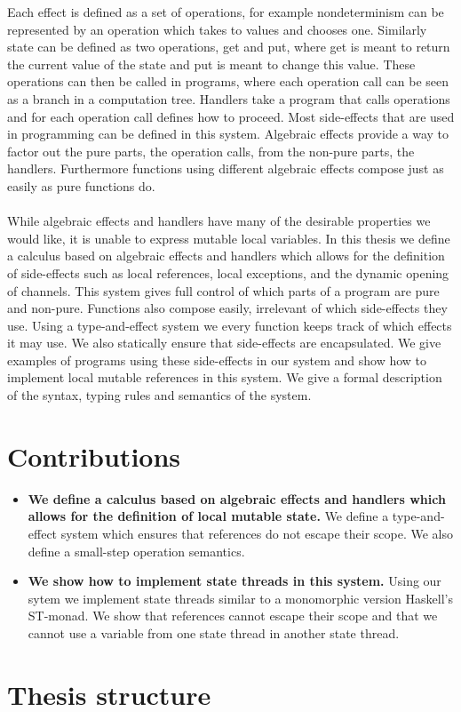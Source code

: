 Each effect is defined as a set of operations, for example nondeterminism can be represented by an operation which takes to values and chooses one.
Similarly state can be defined as two operations, get and put, where get is meant to return the current value of the state and put is meant to change this value.
These operations can then be called in programs, where each operation call can be seen as a branch in a computation tree.
Handlers take a program that calls operations and for each operation call defines how to proceed.
Most side-effects that are used in programming can be defined in this system.
Algebraic effects provide a way to factor out the pure parts, the operation calls, from the non-pure parts, the handlers.
Furthermore functions using different algebraic effects compose just as easily as pure functions do.
\\\\
While algebraic effects and handlers have many of the desirable properties we would like, it is unable to express mutable local variables.
In this thesis we define a calculus based on algebraic effects and handlers which allows for the definition of side-effects such as local references, local exceptions, and the dynamic opening of channels.
This system gives full control of which parts of a program are pure and non-pure.
Functions also compose easily, irrelevant of which side-effects they use.
Using a type-and-effect system we every function keeps track of which effects it may use.
We also statically ensure that side-effects are encapsulated.
We give examples of programs using these side-effects in our system and show how to implement local mutable references in this system.
We give a formal description of the syntax, typing rules and semantics of the system.

\section{Contributions}
\begin{itemize}

\item \textbf{We define a calculus based on algebraic effects and handlers which allows for the definition of local mutable state.}
We define a type-and-effect system which ensures that references do not escape their scope.
We also define a small-step operation semantics.

\item \textbf{We show how to implement state threads in this system.}
Using our sytem we implement state threads similar to a monomorphic version Haskell's ST-monad.
We show that references cannot escape their scope and that we cannot use a variable from one state thread in another state thread.

\end{itemize}

\section{Thesis structure}
